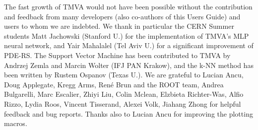 \begin{details}
The fast growth of TMVA would not have been possible without the 
contribution and feedback from many developers (also co-authors of this Users Guide)
and users to whom we are indebted. 
%
We thank in particular the CERN Summer students Matt Jachowski (Stanford U.) for the 
implementation of TMVA's MLP neural network, and Yair Mahalalel (Tel Aviv U.) for a 
significant improvement of PDE-RS. The Support Vector Machine has been contributed to 
TMVA by Andrzej Zemla and Marcin Wolter (IFJ PAN Krakow), and the k-NN method has 
been written by Rustem Ospanov (Texas U.). 
%
We are grateful to
%
Lucian Ancu,
Doug Applegate, 
Kregg Arms, 
Ren\'e Brun and the ROOT team, 
Andrea Bulgarelli,
Marc Escalier,
Zhiyi Liu, 
Colin Mclean,
Elzbieta Richter-Was, 
Alfio Rizzo,
Lydia Roos,
Vincent Tisserand,
Alexei Volk,
Jiahang Zhong
%
for helpful feedback and bug reports. Thanks also to Lucian Ancu for 
improving the plotting macros.
\end{details}
